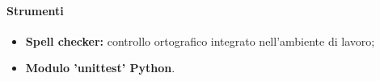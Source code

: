 \paragraph{Strumenti}
\begin{itemize}
    \item \textbf{Spell checker:} controllo ortografico integrato nell’ambiente di lavoro;
    \item \textbf{Modulo 'unittest' Python}.
\end{itemize}